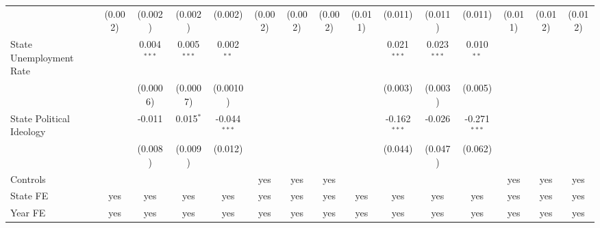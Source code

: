 \documentclass[
]{article}
\let\origtable\table
\let\endorigtable\endtable
\renewenvironment{table}[1][ht]{
      \expandafter\origtable\expandafter[H]
    }{
      \endorigtable
    }
\begin{document}
\begin{table}[htbp]
\begin{adjustbox}{width = 1.5\textwidth, center}
\begin{threeparttable}[b]
\begin{tabular}{lcccccccccccccc}
                                                      & (0.002)        & (0.002)        & (0.002)        & (0.002)        & (0.002)        & (0.002)        & (0.002)        & (0.011)        & (0.011)        & (0.011)        & (0.011)        & (0.011)        & (0.012)        & (0.012)\\   
            State Unemployment Rate                   &                & 0.004$^{***}$  & 0.005$^{***}$  & 0.002$^{**}$   &                &                &                &                & 0.021$^{***}$  & 0.023$^{***}$  & 0.010$^{**}$   &                &                &   \\   
                                                      &                & (0.0006)       & (0.0007)       & (0.0010)       &                &                &                &                & (0.003)        & (0.003)        & (0.005)        &                &                &   \\   
            State Political Ideology                  &                & -0.011         & 0.015$^{*}$    & -0.044$^{***}$ &                &                &                &                & -0.162$^{***}$ & -0.026         & -0.271$^{***}$ &                &                &   \\   
                                                      &                & (0.008)        & (0.009)        & (0.012)        &                &                &                &                & (0.044)        & (0.047)        & (0.062)        &                &                &   \\   
            \midrule 
            Controls                                  &                &                &                &                & yes            & yes            & yes            &                &                &                &                & yes            & yes            & yes\\  
            State FE                                  & yes            & yes            & yes            & yes            & yes            & yes            & yes            & yes            & yes            & yes            & yes            & yes            & yes            & yes\\  
            Year FE                                   & yes            & yes            & yes            & yes            & yes            & yes            & yes            & yes            & yes            & yes            & yes            & yes            & yes            & yes\\  

\end{tabular}
\end{threeparttable}
\end{adjustbox}
\end{table}
\end{document}
